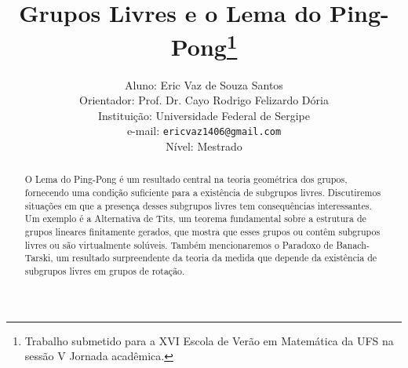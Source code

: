 \documentclass[a4paper,12pt]{article}
\title{Grupos Livres e o Lema do Ping-Pong\footnote{Trabalho submetido para a XVI Escola de Verão em Matemática da UFS na sessão V Jornada acadêmica.}}
\author{Aluno: Eric Vaz de Souza Santos\\ Orientador: Prof. Dr. Cayo Rodrigo Felizardo Dória\\
Instituição: Universidade Federal de Sergipe\\
e-mail: \texttt{ericvaz1406@gmail.com}\\
Nível: Mestrado}
\begin{document}
\maketitle

\begin{abstract}
    O Lema do Ping-Pong é um resultado central na teoria geométrica dos grupos, fornecendo uma condição suficiente para a existência de subgrupos livres. Discutiremos situações em que a presença desses subgrupos livres tem consequências interessantes. Um exemplo é a Alternativa de Tits, um teorema fundamental sobre a estrutura de grupos lineares finitamente gerados, que mostra que esses grupos ou contêm subgrupos livres ou são virtualmente solúveis. Também mencionaremos o Paradoxo de Banach-Tarski, um resultado surpreendente da teoria da medida que depende da existência de subgrupos livres em grupos de rotação.
\end{abstract}
\end{document}
